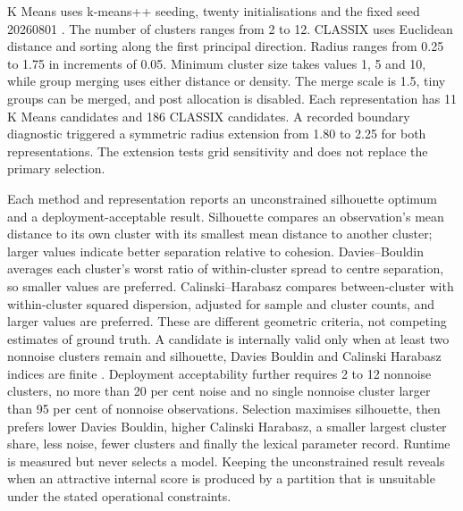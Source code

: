 K Means uses k-means++ seeding, twenty initialisations and the fixed seed 20260801 \citep{macqueen1967kmeans,arthur2007kmeanspp}. The number of clusters ranges from 2 to 12. CLASSIX uses Euclidean distance and sorting along the first principal direction. Radius ranges from 0.25 to 1.75 in increments of 0.05. Minimum cluster size takes values 1, 5 and 10, while group merging uses either distance or density. The merge scale is 1.5, tiny groups can be merged, and post allocation is disabled. Each representation has 11 K Means candidates and 186 CLASSIX candidates. A recorded boundary diagnostic triggered a symmetric radius extension from 1.80 to 2.25 for both representations. The extension tests grid sensitivity and does not replace the primary selection.

Each method and representation reports an unconstrained silhouette optimum and a deployment-acceptable result. Silhouette compares an observation's mean distance to its own cluster with its smallest mean distance to another cluster; larger values indicate better separation relative to cohesion. Davies--Bouldin averages each cluster's worst ratio of within-cluster spread to centre separation, so smaller values are preferred. Calinski--Harabasz compares between-cluster with within-cluster squared dispersion, adjusted for sample and cluster counts, and larger values are preferred. These are different geometric criteria, not competing estimates of ground truth. A candidate is internally valid only when at least two nonnoise clusters remain and silhouette, Davies Bouldin and Calinski Harabasz indices are finite \citep{rousseeuw1987silhouettes,davies1979separation,calinski1974dendrite}. Deployment acceptability further requires 2 to 12 nonnoise clusters, no more than 20 per cent noise and no single nonnoise cluster larger than 95 per cent of nonnoise observations. Selection maximises silhouette, then prefers lower Davies Bouldin, higher Calinski Harabasz, a smaller largest cluster share, less noise, fewer clusters and finally the lexical parameter record. Runtime is measured but never selects a model. Keeping the unconstrained result reveals when an attractive internal score is produced by a partition that is unsuitable under the stated operational constraints.

